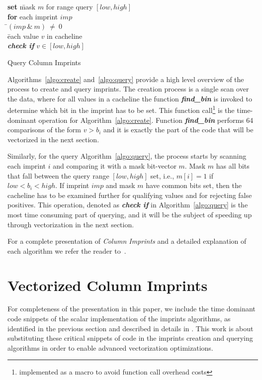 \documentclass[sigconf]{acmart}
\begin{document}
\begin{algorithm}[t]
\begin{tabbing}
{\bf set} \=mask $m$ for range query $[low,high]$\\
{\bf for} each imprint $imp$\\
     \=$(imp\ \&\ m)\ \not=\ 0$\\
    \> \=each value $v$ in cacheline\\
    \>\>\>\textbf{\textit{check if}} $v\in [low,high]$
\end{tabbing}        
\caption{Query Column Imprints\label{algo:query}}
\end{algorithm}

Algorithms~\ref{algo:create} and~\ref{algo:query} provide a high level overview of the process to
create and query imprints. The creation process is a single scan over the data, where
for all values in a cacheline the function \textbf{\textit{find\_bin}} is invoked to determine which
bit in the imprint has to be set. This function call\footnote{implemented as a macro to avoid function call
overhead costs} is the time-dominant operation for Algorithm~\ref{algo:create}. Function \textbf{\textit{find\_bin}}
performs 64 comparisons of the form $v > b_i$ and it is exactly the part of the code that will be vectorized
in the next section.

Similarly, for the query Algorithm~\ref{algo:query}, the process starts by scanning each imprint $i$ and comparing
it with a mask bit-vector $m$. Mask $m$ has all bits that fall between the query range $[low,high]$ set,
i.e., $m[i] = 1$ if $low<b_i<high$. If imprint $imp$ and mask $m$ have common bits set, then the cacheline has to
be examined further for qualifying values and for rejecting false positives. This operation, denoted as
\textbf{\textit{check if}} in Algorithm~\ref{algo:query} is the most time consuming part of querying, and it will
be the subject of speeding up through vectorization in the next section.

For a complete presentation of {\em Column Imprints} and a detailed explanation of each algorithm we refer the
reader to~\cite{DBLP:conf/sigmod/SidirourgosK13}.


\section{Vectorized Column Imprints}\label{sec:concept}

For completeness of the presentation in this paper, we include the time dominant code snippets
of the scalar implementation of the imprints algorithms, as identified in the previous section and
described in details in \cite{DBLP:conf/sigmod/SidirourgosK13}. This work is about substituting these critical
snippets of code in the imprints creation and querying algorithms in order to enable advanced vectorization
optimizations.  
\end{document}
